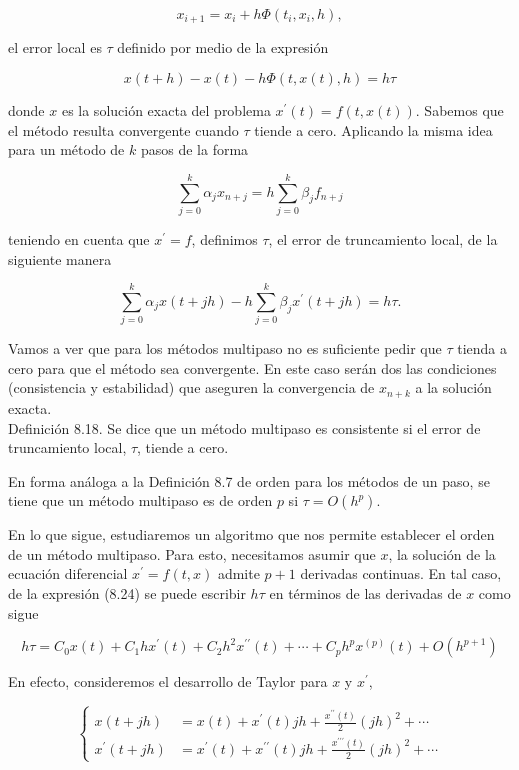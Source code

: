 \documentclass[10pt]{article}
\begin{document}
$$
x_{i+1}=x_{i}+h \Phi\left(t_{i}, x_{i}, h\right),
$$

el error local es $\tau$ definido por medio de la expresión

$$
x(t+h)-x(t)-h \Phi(t, x(t), h)=h \tau
$$

donde $x$ es la solución exacta del problema $x^{\prime}(t)=f(t, x(t))$. Sabemos que el método resulta convergente cuando $\tau$ tiende a cero. Aplicando la misma idea para un método de $k$ pasos de la forma

$$
\sum_{j=0}^{k} \alpha_{j} x_{n+j}=h \sum_{j=0}^{k} \beta_{j} f_{n+j}
$$

teniendo en cuenta que $x^{\prime}=f$, definimos $\tau$, el error de truncamiento local, de la siguiente manera


\begin{equation*}
\sum_{j=0}^{k} \alpha_{j} x(t+j h)-h \sum_{j=0}^{k} \beta_{j} x^{\prime}(t+j h)=h \tau . \tag{8.24}
\end{equation*}


Vamos a ver que para los métodos multipaso no es suficiente pedir que $\tau$ tienda a cero para que el método sea convergente. En este caso serán dos las condiciones (consistencia y estabilidad) que aseguren la convergencia de $x_{n+k}$ a la solución exacta.\\
Definición 8.18. Se dice que un método multipaso es consistente si el error de truncamiento local, $\tau$, tiende a cero.

En forma análoga a la Definición 8.7 de orden para los métodos de un paso, se tiene que un método multipaso es de orden $p$ si $\tau=O\left(h^{p}\right)$.

En lo que sigue, estudiaremos un algoritmo que nos permite establecer el orden de un método multipaso. Para esto, necesitamos asumir que $x$, la solución de la ecuación diferencial $x^{\prime}=f(t, x)$ admite $p+1$ derivadas continuas. En tal caso, de la expresión (8.24) se puede escribir $h \tau$ en términos de las derivadas de $x$ como sigue


\begin{equation*}
h \tau=C_{0} x(t)+C_{1} h x^{\prime}(t)+C_{2} h^{2} x^{\prime \prime}(t)+\cdots+C_{p} h^{p} x^{(p)}(t)+O\left(h^{p+1}\right) \tag{8.25}
\end{equation*}


En efecto, consideremos el desarrollo de Taylor para $x$ y $x^{\prime}$,

$$
\left\{\begin{aligned}
x(t+j h) & =x(t)+x^{\prime}(t) j h+\frac{x^{\prime \prime}(t)}{2}(j h)^{2}+\cdots \\
x^{\prime}(t+j h) & =x^{\prime}(t)+x^{\prime \prime}(t) j h+\frac{x^{\prime \prime \prime}(t)}{2}(j h)^{2}+\cdots
\end{aligned}\right.
$$
\end{document}
